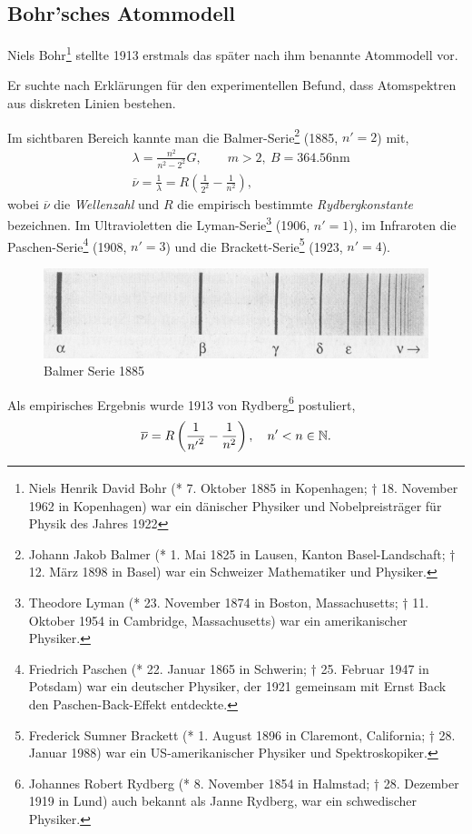 \subsection{Bohr'sches Atommodell}

Niels Bohr\footnote{Niels Henrik David Bohr (* 7. Oktober 1885 in Kopenhagen; †
18. November 1962 in Kopenhagen) war ein dänischer Physiker und
Nobelpreisträger für Physik des Jahres 1922} stellte 1913 erstmals
das später nach ihm benannte Atommodell vor.

Er suchte nach Erklärungen für den experimentellen Befund, dass
Atomspektren aus diskreten Linien bestehen.

Im sichtbaren Bereich kannte man die Balmer-Serie\footnote{Johann Jakob Balmer
(* 1. Mai 1825 in Lausen, Kanton Basel-Landschaft; † 12. März 1898 in Basel)
war ein Schweizer Mathematiker und Physiker.} (1885, $n'=2$) mit,
\begin{align*}
&\lambda = \frac{n^2}{n^2-2^2}G,\qquad m>2,\ B=364.56\mathrm{nm}\\
&\overline{\nu} = \frac{1}{\lambda} = R\left(\frac{1}{2^2}-\frac{1}{n^2}
\right),
\end{align*}
wobei $\overline{\nu}$ die \emph{Wellenzahl} und $R$ die empirisch bestimmte
\emph{Rydbergkonstante} bezeichnen. Im Ultravioletten die
Lyman-Serie\footnote{Theodore Lyman (* 23. November 1874 in Boston,
Massachusetts; † 11. Oktober 1954 in Cambridge, Massachusetts) war ein
amerikanischer Physiker.} (1906, $n'=1$), im Infraroten die
Paschen-Serie\footnote{Friedrich Paschen (* 22. Januar 1865 in Schwerin; † 25.
Februar 1947 in Potsdam) war ein deutscher Physiker, der 1921 gemeinsam mit
Ernst Back den Paschen-Back-Effekt entdeckte.} (1908, $n'=3$) und die
Brackett-Serie\footnote{Frederick Sumner Brackett (* 1. August 1896 in
Claremont, California; † 28. Januar 1988) war ein US-amerikanischer Physiker
und Spektroskopiker.} (1923, $n'=4$). \begin{figure}[!htbp]
	\centering
	\includegraphics[width=\textwidth]{fig/3-BalmerSerie.png}
	\caption{Balmer Serie 1885}
\end{figure}

Als empirisches Ergebnis wurde 1913 von Rydberg\footnote{Johannes Robert
Rydberg (* 8. November 1854 in Halmstad; † 28. Dezember 1919 in Lund) auch
bekannt als Janne Rydberg, war ein schwedischer Physiker.} postuliert,
\begin{align*}
\overline{\nu} = R\left(\frac{1}{{n'}^2}-\frac{1}{n^2}\right),\quad n'<n\in\mathbb{N}.
\end{align*}

